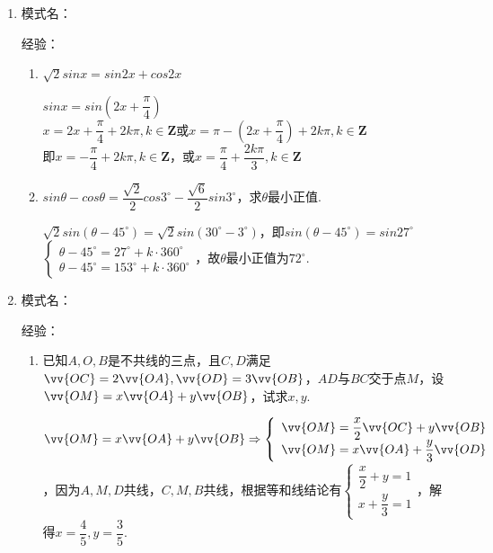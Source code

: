 \begin{enumerate}
    \item 模式名：

    经验：
    \begin{enumerate}
        \item $\sqrt{2} sinx = sin2x + cos2x$
        \begin{jieda}
            $sinx = sin(2x+\dfrac{\pi}{4})$ \\
            $x = 2x+\dfrac{\pi}{4} + 2k\pi, k \in \mathbf{Z}$或$x = \pi - (2x+\dfrac{\pi}{4}) + 2k\pi, k \in \mathbf{Z}$ \\
            即$x = -\dfrac{\pi}{4} + 2k\pi, k \in \mathbf{Z}$，或$x = \dfrac{\pi}{4} + \dfrac{2k\pi}{3}, k \in \mathbf{Z}$
        \end{jieda}
        \item $sin\theta - cos\theta = \dfrac{\sqrt{2}}{2}cos3^{\circ} - \dfrac{\sqrt{6}}{2}sin3^{\circ}$，求$\theta$最小正值.
        \begin{jieda}
            $\sqrt{2}sin(\theta - 45^{\circ}) = \sqrt{2}sin(30^{\circ}-3^{\circ})$，即$sin(\theta - 45^{\circ}) = sin27^{\circ}$ \\
            $\left \{ \begin{array}{l}
                 \theta - 45^{\circ} =  27^{\circ} + k \cdot 360^{\circ} \\
                 \theta - 45^{\circ} =  153^{\circ} + k \cdot 360^{\circ}  
            \end{array} \right.$，故$\theta$最小正值为$72^{\circ}$.
        \end{jieda}
    \end{enumerate}
    \item 模式名：

    经验：
    \begin{enumerate}
        \item 已知$A,O,B$是不共线的三点，且$C,D$满足$\vv{OC} = 2 \vv{OA}, \vv{OD} = 3 \vv{OB}$，$AD$与$BC$交于点$M$，设$\vv{OM} = x \vv{OA} + y \vv{OB}$，试求$x, y$.
        \begin{jieda}
            $\vv{OM} = x \vv{OA} + y \vv{OB} \Rightarrow \left \{ \begin{array}{l}
                 \vv{OM} = \dfrac{x}{2}\vv{OC} + y\vv{OB}  \\
                 \vv{OM} = x \vv{OA} + \dfrac{y}{3}\vv{OD} 
            \end{array} \right.$，因为$A, M, D$共线，$C, M, B$共线，根据等和线结论有$\left \{ \begin{array}{l}
                 \dfrac{x}{2} + y = 1  \\
                 x + \dfrac{y}{3} = 1 
            \end{array} \right.$，解得$x = \dfrac{4}{5}, y = \dfrac{3}{5}$.
        \end{jieda}
        

\end{enumerate}
\end{enumerate}
